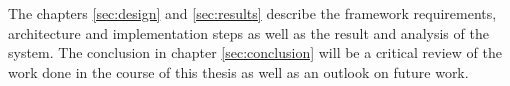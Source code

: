 The chapters \ref{sec:design}  and \ref{sec:results}  describe the framework requirements, architecture and implementation steps as well as the result and analysis of the system. The conclusion in chapter \ref{sec:conclusion} will be a critical review of the work done in the course of this thesis as well as an outlook on future work.
